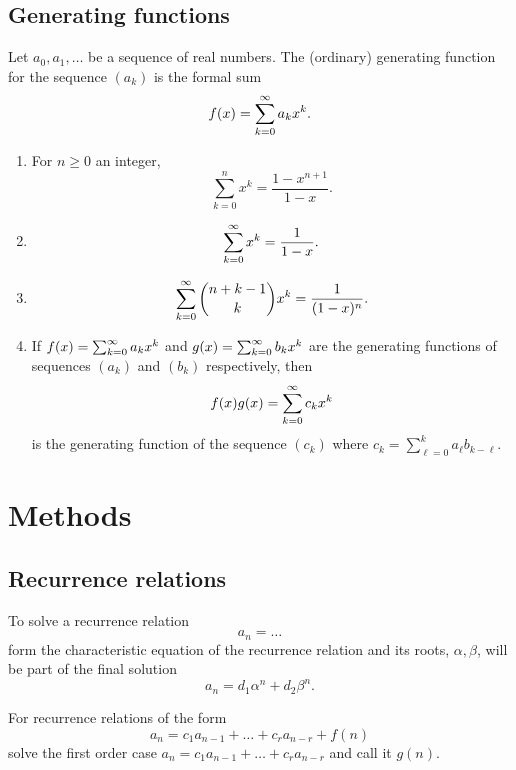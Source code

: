 \documentclass[10pt, a4paper]{article}
\begin{document}
\subsection{Generating functions}

\begin{definition}
    Let $a_0, a_1, \dotsc$ be a sequence of real numbers.
    The
    (ordinary)
    generating function for the sequence $(a_k)$ is the formal sum
    \[
    f(x) = \sum_{k = 0}^{\infty} a_kx ^ k.
    \]
\end{definition}

\begin{lemma}
    \begin{enumerate}[label = (\alph*)]
        \item
        For $n \geq 0$ an integer,
        \[
        \sum_{k = 0}^{n}x ^ k = \frac{1 - x ^ {n + 1}}{1 - x}.
        \]

        \item
        \[
        \sum_{k = 0}^{\infty} x ^ k = \frac{1}{1 - x}.
        \]

        \item
        \[
        \sum_{k = 0}^{\infty}\binom{n + k - 1}{k}x ^ k = \frac{1}{(1 - x) ^ n}.
        \]

        \item
        If $f(x) = \sum_{k = 0}^{\infty} a_kx ^ k$ and $g(x) = \sum_{k = 0}^{\infty} b_kx ^ k$ are the generating functions of sequences $(a_k)$ and $(b_k)$ respectively,
        then
        \[
        f(x)g(x) = \sum_{k = 0}^{\infty} c_kx ^ k
        \]
        is the generating function of the sequence $(c_k)$ where $c_k = \sum_{\ell = 0}^{k}a_{\ell}b_{k - \ell}$.
    \end{enumerate}
\end{lemma}

\newpage

\section{Methods}

\subsection{Recurrence relations}
To solve a recurrence relation
\[
a_n = \dotsc
\]
form the characteristic equation of the recurrence relation and its roots,
$\alpha, \beta$,
will be part of the final solution
\[
a_n = d_1\alpha ^ n + d_2\beta ^ n.
\]

For recurrence relations of the form
\[
a_n = c_1a_{n - 1} + \dotsc + c_ra_{n - r} + f(n)
\]
solve the first order case $a_n = c_1a_{n - 1} + \dotsc + c_ra_{n - r}$ and call it $g(n)$.
\end{document}
